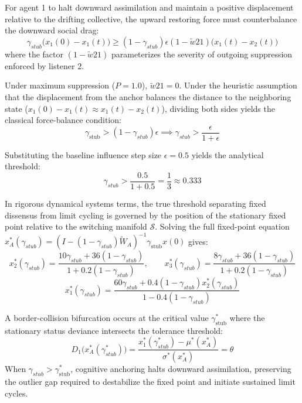 For agent 1 to halt downward assimilation and maintain a positive displacement relative to the drifting collective, the upward restoring force must counterbalance the downward social drag\cite{acemoglu2013opinion}: $$\gamma_{stub} \big(x_1(0) - x_1(t)\big) \ge (1 - \gamma_{stub}) \epsilon (1 - \tilde{w}{21}) \big(x_1(t) - x_2(t)\big)$$ where the factor $(1 - \tilde{w}{21})$ parameterizes the severity of outgoing suppression enforced by listener 2\cite{degroot1974reaching,acemoglu2013opinion}.

Under maximum suppression ($P = 1.0$), $\tilde{w}{21} = 0$\cite{degroot1974reaching}. Under the heuristic assumption that the displacement from the anchor balances the distance to the neighboring state ($x_1(0) - x_1(t) \approx x_1(t) - x_2(t)$), dividing both sides yields the classical force-balance condition\cite{degroot1974reaching,acemoglu2013opinion}: $$\gamma_{\text{stub}} > (1 - \gamma_{stub}) \epsilon \implies \gamma_{stub} > \frac{\epsilon}{1 + \epsilon}$$

Substituting the baseline influence step size $\epsilon = 0.5$ yields the analytical threshold\cite{degroot1974reaching}: $$\gamma_{stub} > \frac{0.5}{1 + 0.5} = \frac{1}{3} \approx 0.333$$

In rigorous dynamical systems terms, the true threshold separating fixed dissensus from limit cycling is governed by the position of the stationary fixed point relative to the switching manifold $\mathcal{S}$\cite{acemoglu2013opinion,hajnal1958weak}. Solving the full fixed-point equation $x_A^*(\gamma_{stub}) = (I - (1 - \gamma_{stub}) \tilde{W}_A)^{-1} \gamma_{\text{stub}} x(0)$ gives\cite{acemoglu2013opinion}: $$x_2^*(\gamma_{stub}) = \frac{10 \gamma_{stub} + 36 (1 - \gamma_{stub})}{1 + 0.2 (1 - \gamma_{stub})}, \qquad x_3^*(\gamma_{stub}) = \frac{8 \gamma_{stub} + 36 (1 - \gamma_{stub})}{1 + 0.2 (1 - \gamma_{stub})}$$ $$x_1^*(\gamma_{stub}) = \frac{60 \gamma_{stub} + 0.4 (1 - \gamma_{stub}) x_2^*(\gamma_{stub})}{1 - 0.4 (1 - \gamma_{stub})}$$

A border-collision bifurcation occurs at the critical value $\gamma_{\text{stub}}^*$ where the stationary status deviance intersects the tolerance threshold\cite{acemoglu2013opinion}: $$D_1\big(x_A^*(\gamma_{stub}^*)\big) = \frac{x_1^*(\gamma_{stub}^*) - \mu^*(x_A^*)}{\sigma^*(x_A^*)} = \theta$$ When $\gamma_{stub} > \gamma_{\text{stub}}^*$, cognitive anchoring halts downward assimilation, preserving the outlier gap required to destabilize the fixed point and initiate sustained limit cycles\cite{degroot1974reaching,acemoglu2013opinion}.

